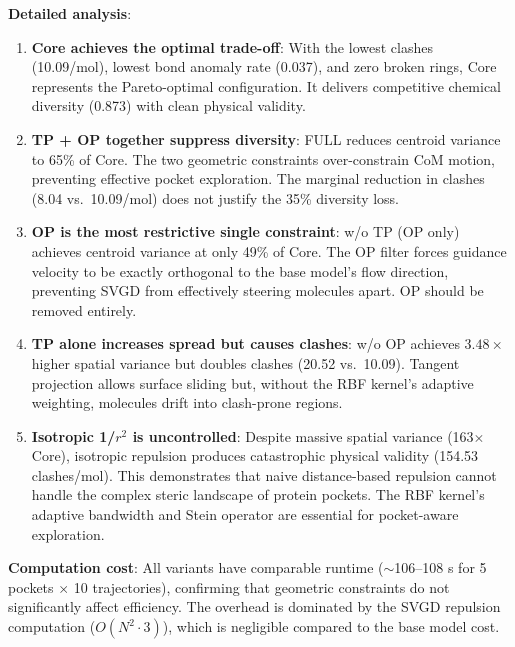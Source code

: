 \documentclass[a4paper,11pt]{article}
\begin{document}
\textbf{Detailed analysis}:

\begin{enumerate}
  \item \textbf{Core achieves the optimal trade-off}: With the lowest clashes
    (10.09/mol), lowest bond anomaly rate (0.037), and zero broken rings, Core
    represents the Pareto-optimal configuration.  It delivers competitive
    chemical diversity (0.873) with clean physical validity.

  \item \textbf{TP + OP together suppress diversity}: FULL reduces centroid
    variance to 65\% of Core.  The two geometric constraints over-constrain CoM
    motion, preventing effective pocket exploration.  The marginal reduction in
    clashes (8.04 vs.\ 10.09/mol) does not justify the 35\% diversity loss.

  \item \textbf{OP is the most restrictive single constraint}: w/o TP (OP only)
    achieves centroid variance at only 49\% of Core.  The OP filter forces
    guidance velocity to be exactly orthogonal to the base model's flow
    direction, preventing SVGD from effectively steering molecules apart.  OP
    should be removed entirely.

  \item \textbf{TP alone increases spread but causes clashes}: w/o OP achieves
    $3.48\times$ higher spatial variance but doubles clashes (20.52 vs.\ 10.09).
    Tangent projection allows surface sliding but, without the RBF kernel's
    adaptive weighting, molecules drift into clash-prone regions.

  \item \textbf{Isotropic 1/$r^2$ is uncontrolled}: Despite massive spatial
    variance (163$\times$ Core), isotropic repulsion produces catastrophic
    physical validity (154.53 clashes/mol).  This demonstrates that naive
    distance-based repulsion cannot handle the complex steric landscape of
    protein pockets.  The RBF kernel's adaptive bandwidth and Stein operator are
    essential for pocket-aware exploration.
\end{enumerate}

\textbf{Computation cost}: All variants have comparable runtime ($\sim$106--108 s
for 5 pockets $\times$ 10 trajectories), confirming that geometric constraints do
not significantly affect efficiency.  The overhead is dominated by the SVGD
repulsion computation ($O(N^2 \cdot 3)$), which is negligible compared to the
base model cost.
\end{document}
